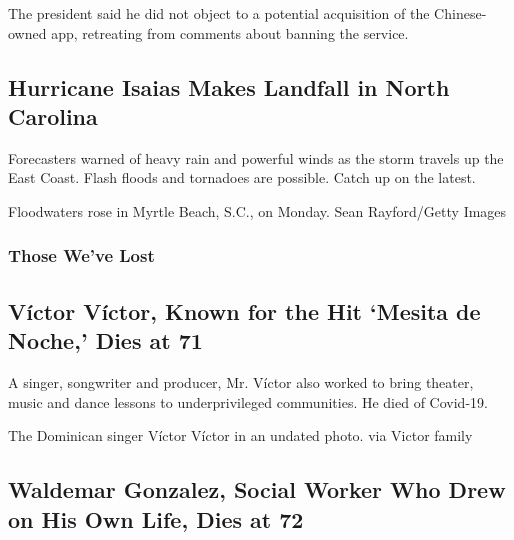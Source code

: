 The president said he did not object to a potential acquisition of the
Chinese-owned app, retreating from comments about banning the service.

\href{/2020/08/03/us/isaias-storm-updates.html}{}

\hypertarget{hurricane-isaias-makes-landfall-in-north-carolina}{%
\subsection{Hurricane Isaias Makes Landfall in North
Carolina}\label{hurricane-isaias-makes-landfall-in-north-carolina}}

Forecasters warned of heavy rain and powerful winds as the storm travels
up the East Coast. Flash floods and tornadoes are possible. Catch up on
the latest.

\href{/2020/08/03/us/isaias-storm-updates.html}{}

Floodwaters rose in Myrtle Beach, S.C., on Monday. Sean Rayford/Getty
Images

\hypertarget{those-weve-lost}{%
\subsubsection{Those We've Lost}\label{those-weve-lost}}

\href{/2020/08/01/obituaries/victor-victor-dead-coronavirus.html}{}

\hypertarget{vuxedctor-vuxedctor-known-for-the-hit-mesita-de-noche-dies-at-71}{%
\subsection{Víctor Víctor, Known for the Hit `Mesita de Noche,' Dies at
71}\label{vuxedctor-vuxedctor-known-for-the-hit-mesita-de-noche-dies-at-71}}

A singer, songwriter and producer, Mr. Víctor also worked to bring
theater, music and dance lessons to underprivileged communities. He died
of Covid-19.

\href{/2020/08/01/obituaries/victor-victor-dead-coronavirus.html}{}

The Dominican singer Víctor Víctor in an undated photo. via Victor
family

\href{/2020/07/30/obituaries/waldemar-gonzalez-dead-coronavirus.html}{}

\hypertarget{waldemar-gonzalez-social-worker-who-drew-on-his-own-life-dies-at-72}{%
\subsection{Waldemar Gonzalez, Social Worker Who Drew on His Own Life,
Dies at
72}\label{waldemar-gonzalez-social-worker-who-drew-on-his-own-life-dies-at-72}}

